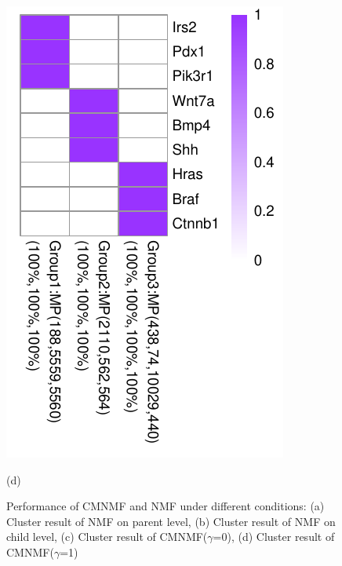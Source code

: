 \documentclass{bmcart}
\begin{document}
\begin{figure}[!h]
\begin{minipage}{.20\linewidth}
   \includegraphics[width=\linewidth]{DrawPictures/v4.pdf}
    \centerline{(d)}
  \end{minipage}
  \caption{Performance of CMNMF and NMF under different conditions: (a) Cluster result of NMF on parent level, (b) Cluster result of NMF on child level, (c) Cluster result of CMNMF($\gamma$=0), (d) Cluster result of CMNMF($\gamma$=1)}
  \label{fig:simulate_data}
\end{figure}
\end{document}
